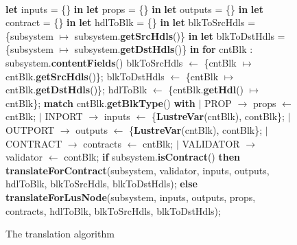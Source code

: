 \documentclass{article}
\begin{document}
\begin{figure}
\begin{algorithmic}
\\

\State \textbf{let} inputs = \{\} \textbf{in}
\State \textbf{let} props = \{\} \textbf{in}
\State \textbf{let} outputs = \{\} \textbf{in}
\State \textbf{let} contract = \{\} \textbf{in}
\State \textbf{let} hdlToBlk = \{\} \textbf{in}
\State \textbf{let} blkToSrcHdls = \{subsystem $\mapsto$ subsystem.\textbf{getSrcHdls}()\} \textbf{in}
\State \textbf{let} blkToDstHdls = \{subsystem $\mapsto$ subsystem.\textbf{getDstHdls}()\} \textbf{in}
\State \textbf{for} cntBlk : subsystem.\textbf{contentFields}()
\State {\ \ \ \ }  blkToSrcHdls $\leftarrow$ \{cntBlk $\mapsto$ cntBlk.\textbf{getSrcHdls}()\};
\State {\ \ \ \ }  blkToDstHdls $\leftarrow$ \{cntBlk $\mapsto$ cntBlk.\textbf{getDstHdls}()\};
\State {\ \ \ \ } hdlToBlk $\leftarrow$ \{cntBlk.\textbf{getHdl}() $\mapsto$ cntBlk\};
\State {\ \ \ \ } \textbf{match}  cntBlk.\textbf{getBlkType}() \textbf{with}
\State {\ \ \ \ } $\mid$ PROP $\rightarrow$ props $\leftarrow$ cntBlk;
\State {\ \ \ \ } $\mid$ INPORT $\rightarrow$ inputs $\leftarrow$ \{\textbf{LustreVar}(cntBlk), contBlk\}; 
\State {\ \ \ \ } $\mid$ OUTPORT $\rightarrow$ outputs $\leftarrow$ \{\textbf{LustreVar}(cntBlk), contBlk\};
\State {\ \ \ \ } $\mid$ CONTRACT $\rightarrow$ contracts $\leftarrow$ cntBlk;
\State {\ \ \ \ } $\mid$ VALIDATOR $\rightarrow$ validator $\leftarrow$ contBlk;
\State \textbf{if} subsystem.\textbf{isContract}() \textbf{then}
\State {\ \ \ \ } \textbf{translateForContract}(subsystem, validator, inputs, outputs, hdlToBlk, 
\State {\ \ \ \ \ \ \ \ \ \ \ \ \ \ \ \ \ \ \ \ \ \ \ \ \ \ \ \ \ \ \ \ \ \ \ \ } blkToSrcHdls, blkToDstHdls);
\State \textbf{else}
\State {\ \ \ \ } \textbf{translateForLusNode}(subsystem, inputs, outputs, props, contracts, hdlToBlk,
\State {\ \ \ \ \ \ \ \ \ \ \ \ \ \ \ \ \ \ \ \ \ \ \ \ \ \ \ \ \ \ \ \ \ \ \ \ } blkToSrcHdls, blkToDstHdls);
\EndFunction
\end{algorithmic}
\label{mainalgo1}
\caption{The translation algorithm}
\end{figure}
\end{document}
